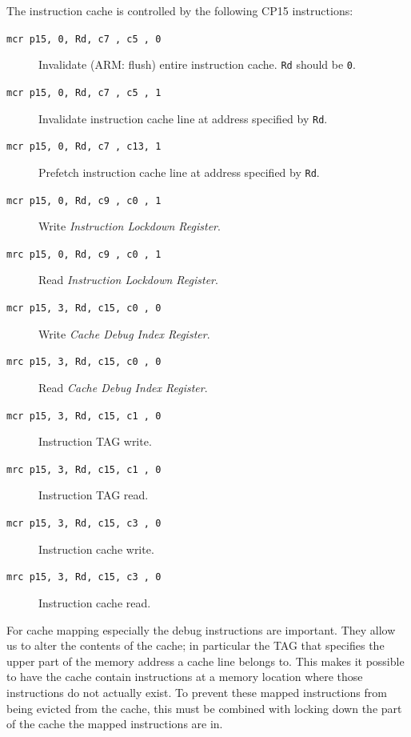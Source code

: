 \documentclass[a4paper,10pt]{report}
\begin{document}
	The instruction cache is controlled by the following CP15 instructions:
	\begin{description}
		\item[\texttt{mcr p15, 0, Rd, c7 , c5 , 0}] Invalidate (ARM: flush) entire instruction cache. \texttt{Rd} should be \texttt{0}.
		\item[\texttt{mcr p15, 0, Rd, c7 , c5 , 1}] Invalidate instruction cache line at address specified by \texttt{Rd}.
		\item[\texttt{mcr p15, 0, Rd, c7 , c13, 1}] Prefetch instruction cache line at address specified by \texttt{Rd}.
		\item[\texttt{mcr p15, 0, Rd, c9 , c0 , 1}] Write \textit{Instruction Lockdown Register}.
		\item[\texttt{mrc p15, 0, Rd, c9 , c0 , 1}] Read \textit{Instruction Lockdown Register}.
		\item[\texttt{mcr p15, 3, Rd, c15, c0 , 0}] Write \textit{Cache Debug Index Register}.
		\item[\texttt{mrc p15, 3, Rd, c15, c0 , 0}] Read \textit{Cache Debug Index Register}.
		\item[\texttt{mcr p15, 3, Rd, c15, c1 , 0}] Instruction TAG write.
		\item[\texttt{mrc p15, 3, Rd, c15, c1 , 0}] Instruction TAG read.
		\item[\texttt{mcr p15, 3, Rd, c15, c3 , 0}] Instruction cache write.
		\item[\texttt{mrc p15, 3, Rd, c15, c3 , 0}] Instruction cache read.
	\end{description}

	For cache mapping especially the debug instructions are important. They allow us to alter the contents of the cache; in particular the TAG that specifies the upper part of the memory address a cache line belongs to. This makes it possible to have the cache contain instructions at a memory location where those instructions do not actually exist. To prevent these mapped instructions from being evicted from the cache, this must be combined with locking down the part of the cache the mapped instructions are in.
	
\end{document}
